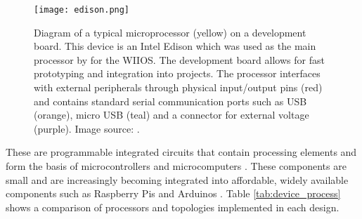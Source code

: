\begin{figure}[H]
	\centering
	\texttt{[image: edison.png]}
	\caption{Diagram of a typical microprocessor (yellow) on a development board. This device is an Intel Edison which was used as the main processor by \textcite{kohout2015device} for the WIIOS. The development board allows for fast prototyping and integration into projects. The processor interfaces with external peripherals through physical input/output pins (red) and contains standard serial communication ports such as USB (orange), micro USB (teal) and a connector for external voltage (purple). Image source: \cite{edison}. }
\end{figure}

These are programmable integrated circuits that contain processing elements \cite{subham2018micro} and form the basis of microcontrollers and microcomputers \cite{crisp2003introduction}. These components are small and are increasingly becoming integrated into affordable, widely available components such as Raspberry Pis and Arduinos \cite{rabault2019open}. Table \ref{tab:device_process} shows a comparison of processors and topologies implemented in each design.

